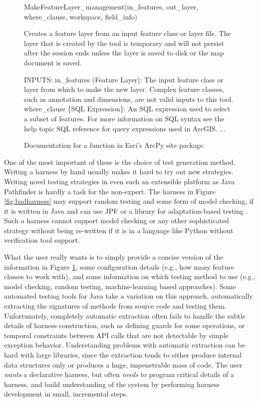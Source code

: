 \begin{figure}[t]
{\scriptsize
\begin{code}
MakeFeatureLayer\_management(in\_features, out\_layer, {where\_clause}, {workspace}, {field\_info})
   
   Creates a feature layer from an input feature class or layer file. The layer
   that is created by the tool is temporary and will not persist after the session
   ends unless the layer is saved to disk or the map document is saved.
    
INPUTS:
 in\_features (Feature Layer):
   The input feature class or layer from which to make the new layer. Complex
   feature classes, such as annotation and dimensions, are not valid inputs to this tool.
 where\_clause \{SQL Expression\}:
   An SQL expression used to select a subset of features. For more information on
   SQL syntax see the help topic SQL reference for query expressions used in ArcGIS.
...
\end{code}
}
\caption{Documentation for a function in Esri's ArcPy site package.}
\label{fig:MakeFeatureLayer}
\end{figure}

One of the most important of these is the choice of test generation
method.  Writing a harness by hand usually makes it hard to try out
new strategies.   Writing novel testing strategies in even such
an extensible platform as Java Pathfinder is hardly a task for the
non-expert.
The harness in Figure \ref{fig:badharness} may support random testing and
some form of model checking, if it is written in Java and can use JPF
or a library for adaptation-based testing \cite{ISSRE12}. Such a
harness cannot support model checking or any other sophisticated strategy
without being re-written if it is in a language like Python without
verification tool support.

What the user really wants is to simply provide a concise version of the information in
Figure \ref{fig:MakeFeatureLayer}, some configuration details (e.g., how many
feature classes to work with), and some information on which testing
method to use (e.g., model checking, random testing, machine-learning
based approaches).  Some automated testing tools for Java \cite{FA11,Pacheco}
take a variation on this approach, automatically extracting the
signatures of methods from source code and testing them.
Unfortunately, completely automatic extraction often fails to handle
the subtle details of harness construction, such as defining guards
for some operations, or temporal constraints between API calls that
are not detectable by simple exception behavior.  Understanding
problems with automatic extraction can be hard with large libraries,
since the extraction tends to either produce internal data structures
only or produces a huge, impenetrable mass of code. The user \emph{wants} a
declarative harness, but often \emph{needs} to program critical details of a
harness, and build understanding of the system by performing harness development in
small, incremental steps.

